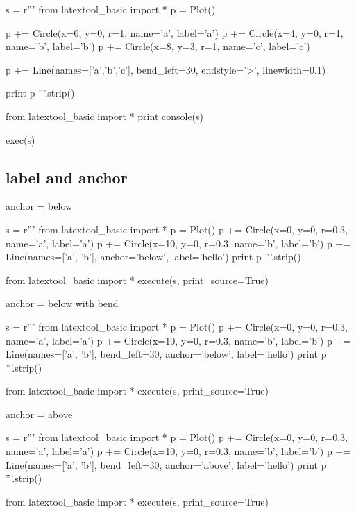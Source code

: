\begin{python}
s = r'''
from latextool_basic import *
p = Plot()

p += Circle(x=0, y=0, r=1, name='a', label='a')
p += Circle(x=4, y=0, r=1, name='b', label='b')
p += Circle(x=8, y=3, r=1, name='c', label='c')

p += Line(names=['a','b','c'], bend_left=30, endstyle='>', linewidth=0.1)

print p
'''.strip()

from latextool_basic import *
print console(s)

exec(s)
\end{python}




\newpage
\subsection{label and anchor}

anchor = below
\begin{python}
s = r'''
from latextool_basic import *
p = Plot()
p += Circle(x=0, y=0, r=0.3, name='a', label='a')
p += Circle(x=10, y=0, r=0.3, name='b', label='b')
p += Line(names=['a', 'b'], anchor='below', label='hello')
print p
'''.strip()

from latextool_basic import *
execute(s, print_source=True)
\end{python}





anchor = below with bend
\begin{python}
s = r'''
from latextool_basic import *
p = Plot()
p += Circle(x=0, y=0, r=0.3, name='a', label='a')
p += Circle(x=10, y=0, r=0.3, name='b', label='b')
p += Line(names=['a', 'b'], bend_left=30, anchor='below', label='hello')
print p
'''.strip()

from latextool_basic import *
execute(s, print_source=True)
\end{python}




\newpage
anchor = above
\begin{python}
s = r'''
from latextool_basic import *
p = Plot()
p += Circle(x=0, y=0, r=0.3, name='a', label='a')
p += Circle(x=10, y=0, r=0.3, name='b', label='b')
p += Line(names=['a', 'b'], bend_left=30, anchor='above', label='hello')
print p
'''.strip()

from latextool_basic import *
execute(s, print_source=True)
\end{python}


